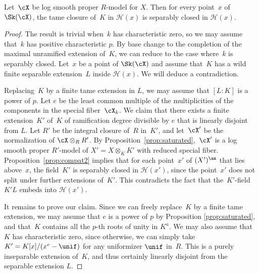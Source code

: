 \begin{lemma}\label{lemma:tame}
Let~$\cX$ be log smooth proper $R$\nobreakdash-model for $X$. Then for every point~$x$ of $\Sk(\cX)$, the tame closure of~$K$ in $\mathscr{H}(x)$ is separably closed in $\mathscr{H}(x)$.
\end{lemma}
\begin{proof}
The result is trivial when~$k$ has characteristic zero, so we may assume that~$k$ has positive characteristic $p$. By base change to the completion of the maximal unramified extension of~$K$, we can reduce to the case where~$k$ is separably closed.
Let~$x$ be a point of $\Sk(\cX)$ and assume that~$K$ has a wild finite separable extension~$L$ inside $\mathscr{H}(x)$. We will deduce a contradiction.

Replacing~$K$ by a finite tame extension in $L$, we may assume that $[L\colon K]$ is a power of $p$. Let $e$ be the least common multiple of the multiplicities of the components in the special fiber~$\cX_k$. We claim that there exists a finite extension~$K'$ of~$K$ of ramification degree divisible by $e$ that is linearly disjoint from $L$.
Let $R'$ be the integral closure of~$R$ in~$K'$, and let~$\cX'$ be the normalization of $\cX\otimes_R R'$. By Proposition~\ref{prop:saturated},~$\cX'$ is a log smooth proper $R'$-model of $X'=X\otimes_K K'$ with reduced special fiber.
Proposition~\ref{prop:compat2} implies that for each point~$x'$ of $(X')^{\an}$ that lies above~$x$, the field~$K'$ is separably closed in $\mathscr{H}(x')$, since the point~$x'$ does not split under further extensions of~$K'$. This contradicts the fact that the~$K'$-field $K'L$ embeds into $\mathscr{H}(x')$.

It remains to prove our claim. Since we can freely replace~$K$ by a finite tame extension, we may assume that $e$ is a power of $p$ by Proposition \ref{prop:saturated}, and that~$K$ contains all the $p$-th roots of unity in $K^a$. We may also assume that~$K$ has characteristic zero, since otherwise, we can simply take $K'=K[x]/(x^e-\unif)$ for any uniformizer $\unif$ in~$R$. This is a purely inseparable extension of~$K$, and thus certainly linearly disjoint from
the separable extension $L$.


\end{proof}
